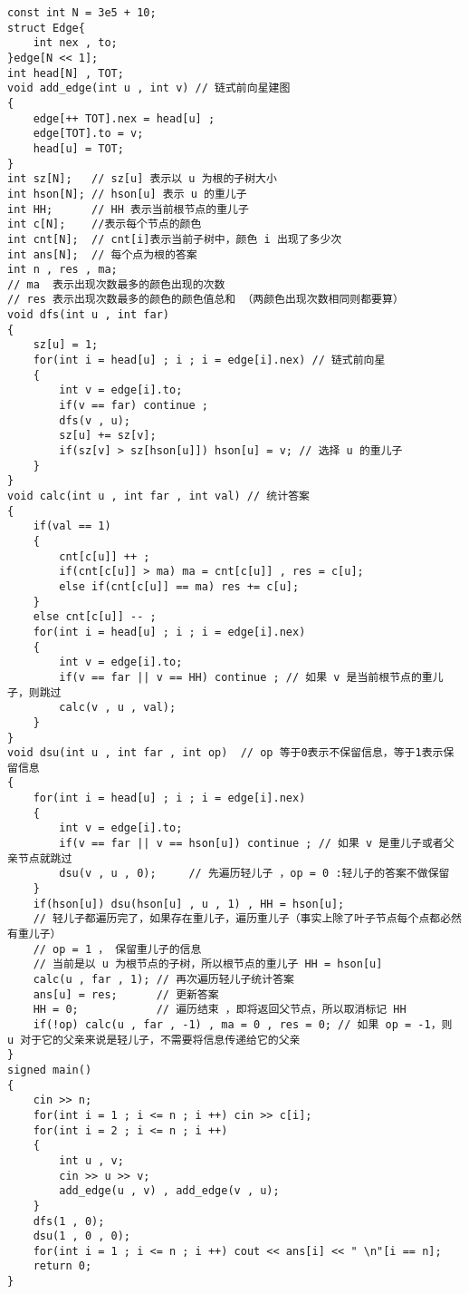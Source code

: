 \documentclass[E:/GsjzTle/main/main.tex]{subfiles}
\begin{document}
\begin{lstlisting}
const int N = 3e5 + 10; 
struct Edge{
	int nex , to;
}edge[N << 1];
int head[N] , TOT;
void add_edge(int u , int v) // 链式前向星建图
{
	edge[++ TOT].nex = head[u] ;
	edge[TOT].to = v;
	head[u] = TOT;
}
int sz[N];   // sz[u] 表示以 u 为根的子树大小 
int hson[N]; // hson[u] 表示 u 的重儿子 
int HH;      // HH 表示当前根节点的重儿子 
int c[N];    //表示每个节点的颜色 
int cnt[N];  // cnt[i]表示当前子树中，颜色 i 出现了多少次 
int ans[N];  // 每个点为根的答案 
int n , res , ma; 
// ma  表示出现次数最多的颜色出现的次数 
// res 表示出现次数最多的颜色的颜色值总和 （两颜色出现次数相同则都要算） 
void dfs(int u , int far)
{
	sz[u] = 1;
	for(int i = head[u] ; i ; i = edge[i].nex) // 链式前向星 
	{
		int v = edge[i].to;
		if(v == far) continue ;
		dfs(v , u); 
		sz[u] += sz[v];  
		if(sz[v] > sz[hson[u]]) hson[u] = v; // 选择 u 的重儿子 
	}
}
void calc(int u , int far , int val) // 统计答案 
{
	if(val == 1) 
	{
		cnt[c[u]] ++ ;
		if(cnt[c[u]] > ma) ma = cnt[c[u]] , res = c[u];
		else if(cnt[c[u]] == ma) res += c[u];
	} 
	else cnt[c[u]] -- ; 
	for(int i = head[u] ; i ; i = edge[i].nex)
	{
		int v = edge[i].to;
		if(v == far || v == HH) continue ; // 如果 v 是当前根节点的重儿子，则跳过
		calc(v , u , val);
	}
} 
void dsu(int u , int far , int op)  // op 等于0表示不保留信息，等于1表示保留信息 
{
	for(int i = head[u] ; i ; i = edge[i].nex)
	{
		int v = edge[i].to;
		if(v == far || v == hson[u]) continue ; // 如果 v 是重儿子或者父亲节点就跳过 
		dsu(v , u , 0);     // 先遍历轻儿子 ，op = 0 :轻儿子的答案不做保留 
	}
	if(hson[u]) dsu(hson[u] , u , 1) , HH = hson[u];
	// 轻儿子都遍历完了，如果存在重儿子，遍历重儿子（事实上除了叶子节点每个点都必然有重儿子）
	// op = 1 ， 保留重儿子的信息 
	// 当前是以 u 为根节点的子树，所以根节点的重儿子 HH = hson[u]
	calc(u , far , 1); // 再次遍历轻儿子统计答案
	ans[u] = res;      // 更新答案 
	HH = 0;			   // 遍历结束 ，即将返回父节点，所以取消标记 HH 
	if(!op) calc(u , far , -1) , ma = 0 , res = 0; // 如果 op = -1，则 u 对于它的父亲来说是轻儿子，不需要将信息传递给它的父亲 
}
signed main()
{
	cin >> n;
	for(int i = 1 ; i <= n ; i ++) cin >> c[i];
	for(int i = 2 ; i <= n ; i ++)
	{
		int u , v;
		cin >> u >> v;
		add_edge(u , v) , add_edge(v , u);
	}
	dfs(1 , 0);
	dsu(1 , 0 , 0);
	for(int i = 1 ; i <= n ; i ++) cout << ans[i] << " \n"[i == n];
	return 0;
}
\end{lstlisting}
\end{document}
